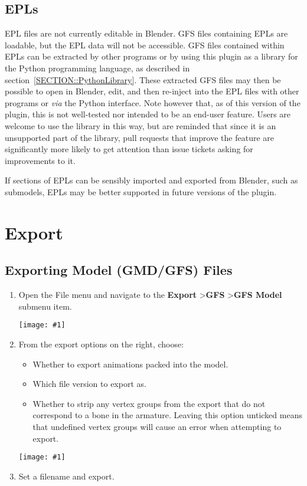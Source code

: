 \documentclass{article}
\newenvironment{guide}[1]
{
	\begin{center}
		\begin{tcolorbox}[%
			colback=black!20, 
			boxrule=0pt, 
			title=Step-by-step: #1,
			enhanced,
			breakable,
			overlay unbroken={%
                \draw[line width=1pt, black, rounded corners]
        	    (frame.north west) rectangle (frame.south east);
			},
    		overlay first={%
        		 \draw[line width=1pt, black, rounded corners]
        	    (frame.south west) -- (frame.north west) -- (frame.north east) -- (frame.south east);
                \draw[line width=1pt, black]
                (frame.south west) -- (frame.south east);
            },
    		overlay middle={%
                \draw[line width=1pt, black]
        	    (frame.north west) rectangle (frame.south east);
        	},
    		overlay last={%
                \draw[line width=1pt, black, rounded corners]
        	    (frame.north west) -- (frame.south west) -- (frame.south east) -- (frame.north east);
                \draw[line width=1pt, black]
                (frame.north west) -- (frame.north east);
           	}
        ]{}
    	\begin{enumerate}
}
{
    		\end{enumerate}
    	\end{tcolorbox}
	\end{center}  	 
}
\newcommand{\guideimage}[1]
{
	\begin{center}
		\texttt{[image: \#1]}
	\end{center}
}
\begin{document}
\clearpage

\subsection{EPLs}
\label{SECTION::Edits::Epls}
EPL files are not currently editable in Blender. GFS files containing EPLs are loadable, but the EPL data will not be accessible. GFS files contained within EPLs can be extracted by other programs or by using this plugin as a library for the Python programming language, as described in section~\ref{SECTION::PythonLibrary}. These extracted GFS files may then be possible to open in Blender, edit, and then re-inject into the EPL files with other programs or \textit{via} the Python interface. Note however that, as of this version of the plugin, this is not well-tested nor intended to be an end-user feature. Users are welcome to use the library in this way, but are reminded that since it is an unsupported part of the library, pull requests that improve the feature are significantly more likely to get attention than issue tickets asking for improvements to it.

If sections of EPLs can be sensibly imported and exported from Blender, such as submodels, EPLs may be better supported in future versions of the plugin.

\clearpage

\section{Export}
\subsection{Exporting Model (GMD/GFS) Files}
\label{SECTION::EXPORT::ExportingModels}
\begin{guide}{Accessing the Model Export Menu}
\item Open the File menu and navigate to the \textbf{Export} \textgreater\space \textbf{GFS} \textgreater\space \textbf{GFS Model} submenu item.
\guideimage{images/export/export_gmd.png}
\item From the export options on the right, choose:
\begin{itemize}
\item Whether to export animations packed into the model.
\item Which file version to export as.
\item Whether to strip any vertex groups from the export that do not correspond to a bone in the armature. Leaving this option unticked means that undefined vertex groups will cause an error when attempting to export.
\end{itemize}
\guideimage{images/export/export_gmd_properties.png}
\item Set a filename and export.
\end{guide}
\end{document}
